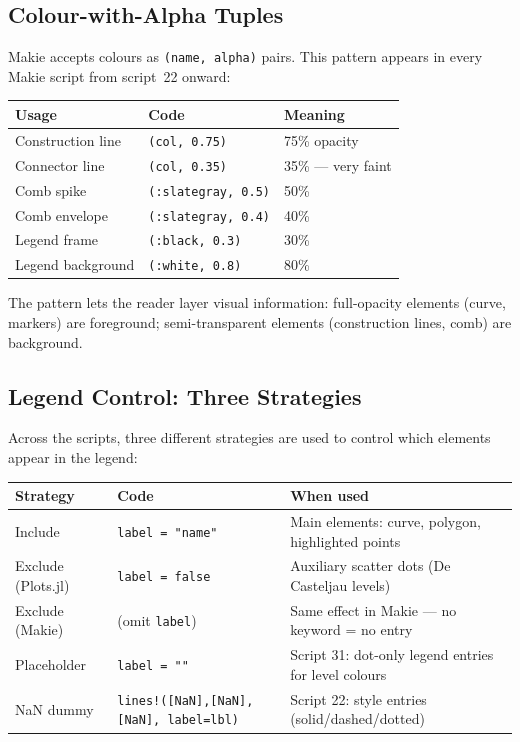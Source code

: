 \documentclass[12pt, a4paper]{article}
\newcommand{\cd}[1]{\texttt{#1}}
\begin{document}
\subsection{Colour-with-Alpha Tuples}

Makie accepts colours as \cd{(name, alpha)} pairs.
This pattern appears in every Makie script from script~22 onward:

\begin{center}
\begin{tabular}{lll}
\toprule
Usage & Code & Meaning \\
\midrule
Construction line & \cd{(col, 0.75)} & 75\% opacity \\
Connector line & \cd{(col, 0.35)} & 35\% --- very faint \\
Comb spike & \cd{(:slategray, 0.5)} & 50\% \\
Comb envelope & \cd{(:slategray, 0.4)} & 40\% \\
Legend frame & \cd{(:black, 0.3)} & 30\% \\
Legend background & \cd{(:white, 0.8)} & 80\% \\
\bottomrule
\end{tabular}
\end{center}

The pattern lets the reader layer visual information:
full-opacity elements (curve, markers) are foreground;
semi-transparent elements (construction lines, comb) are background.

\subsection{Legend Control: Three Strategies}

Across the scripts, three different strategies are used
to control which elements appear in the legend:

\begin{center}
\begin{tabular}{lp{3.5cm}p{4.5cm}}
\toprule
Strategy & Code & When used \\
\midrule
Include & \cd{label = "name"} &
  Main elements: curve, polygon, highlighted points \\
Exclude (Plots.jl) & \cd{label = false} &
  Auxiliary scatter dots (De Casteljau levels) \\
Exclude (Makie) & (omit \cd{label}) &
  Same effect in Makie --- no keyword = no entry \\
Placeholder & \cd{label = ""} &
  Script 31: dot-only legend entries for level colours \\
NaN dummy & \cd{lines!([NaN],[NaN],[NaN], label=lbl)} &
  Script 22: style entries (solid/dashed/dotted) \\
\bottomrule
\end{tabular}
\end{center}
\end{document}

